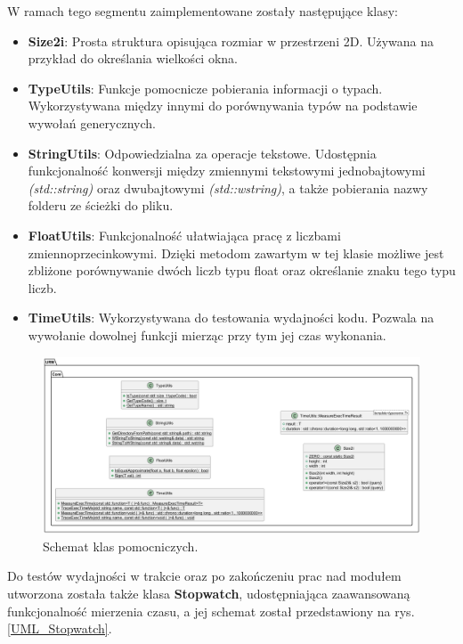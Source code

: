 	W ramach tego segmentu zaimplementowane zostały następujące klasy:
	\begin{itemize}
		\item \textbf{Size2i}: Prosta struktura opisująca rozmiar w przestrzeni 2D. Używana na przykład do określania wielkości okna.
		\item \textbf{TypeUtils}: Funkcje pomocnicze pobierania informacji o typach. Wykorzystywana między innymi do porównywania typów na podstawie wywołań generycznych.
		\item \textbf{StringUtils}: Odpowiedzialna za operacje tekstowe. Udostępnia funkcjonalność konwersji między zmiennymi tekstowymi jednobajtowymi \textit{(std::string)} oraz dwubajtowymi \textit{(std::wstring)}, a także pobierania nazwy folderu ze ścieżki do pliku.
		\item \textbf{FloatUtils}: Funkcjonalność ułatwiająca pracę z liczbami zmiennoprzecinkowymi. Dzięki metodom zawartym w tej klasie możliwe jest zbliżone porównywanie dwóch liczb typu float oraz określanie znaku tego typu liczb.
		\item \textbf{TimeUtils}: Wykorzystywana do testowania wydajności kodu. Pozwala na wywołanie dowolnej funkcji mierząc przy tym jej czas wykonania.
	\end{itemize}
	
	\begin{figure}[h!]
		\centering
		\includegraphics[width=\textwidth]{images/UML/utils.png}
		\caption{Schemat klas pomocniczych.}
		\label{UML_Utils}
	\end{figure}
	
	Do testów wydajności w trakcie oraz po zakończeniu prac nad modułem utworzona została także klasa \textbf{Stopwatch}, udostępniająca zaawansowaną funkcjonalność mierzenia czasu, a jej schemat został przedstawiony na rys. \ref{UML_Stopwatch}.
	
